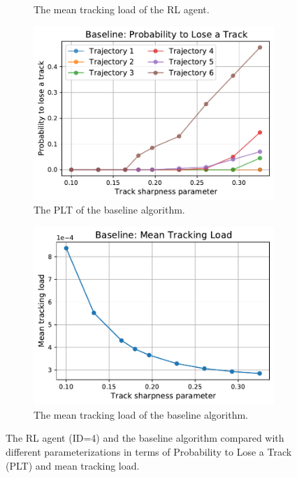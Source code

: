 \documentclass[english, 12pt, a4paper, elec, utf8, a-1b, online]{aaltothesis}
\numberwithin{equation}{section}
\begin{document}
\begin{figure}
\begin{subfigure}[b]{0.45\textwidth}
        \caption{The mean tracking load of the RL agent.}
        \label{fig:penalty_load}
    \end{subfigure}
    \begin{subfigure}[b]{0.45\textwidth}
        \includegraphics[width=\linewidth]{figures/benchmark/Simulations/plt_baseline.pdf}
        \caption{The PLT of the baseline algorithm.}
        \label{fig:baseline_plt}
    \end{subfigure}
    \hfill
    \begin{subfigure}[b]{0.45\textwidth}
        \includegraphics[width=\linewidth]{figures/benchmark/Simulations/tracking_load_baseline.pdf}
        \caption{The mean tracking load of the baseline algorithm.}
        \label{fig:baseline_load}
    \end{subfigure}
    \caption{The RL agent (ID=4) and the baseline algorithm compared with different parameterizations in terms of Probability to Lose a Track (PLT) and mean tracking load.}
    \label{fig:comparison}
\end{figure}
\end{document}
